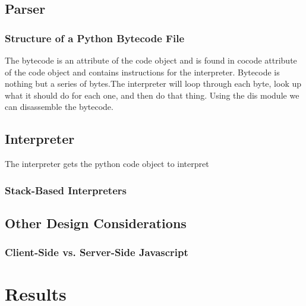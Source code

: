 \documentclass[10pt,a4paper]{article}
\begin{document}
\subsection{Parser}

\subsubsection{Structure of a Python Bytecode File}
The bytecode is an attribute of the code object and is found in cocode attribute of the code object and contains instructions for the interpreter. Bytecode is nothing but a series of bytes.The interpreter will loop through each byte, look up what it should do for each one, and then do that thing. Using the dis module we can disassemble the bytecode.



\subsection{Interpreter}
The interpreter gets the python code object to interpret

\subsubsection{Stack-Based Interpreters} 

\subsection{Other Design Considerations}
\subsubsection{Client-Side vs. Server-Side Javascript}

\section{Results}
\end{document}
